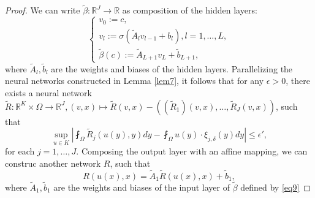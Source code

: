 \documentclass[reqno]{amsart}
\theoremstyle{plain}
\theoremstyle{definition}
\newcommand{\bb}[1]{\mathbb{#1}}
\begin{document}
\begin{proof}
    We can write $\tilde{\beta}:\bb R^J \to \bb R$ as composition of the hidden layers:
    $$
    \begin{cases} \label{eq9}
        v_0 := c,\\
        v_l := \sigma\left(\tilde{A}_lv_{l-1} + b_l\right), l = 1, \dots, L,\\
        \tilde{\beta}(c) := \tilde{A}_{L+1}v_L + \tilde{b}_{L+1},
    \end{cases}
    $$
    where $\tilde{A}_l, \tilde{b}_l$ are the weights and biases of the hidden layers. Parallelizing the neural networks constructed in Lemma \ref{lem7}, it follows that for any $\epsilon > 0$, there exists a neural network $\tilde{R}: \bb R^K \times \Omega \to \bb R^J, (v,x) \mapsto \tilde{R}(v,x) - ((\tilde{R}_1)(v,x), \dots, \tilde{R}_J(v,x))$, such that
    $$ \sup_{u \in K}\left|\fint_\Omega \tilde{R}_j(u(y),y) dy - \fint_\Omega u(y)\cdot \xi_{j,\delta}(y) dy\right| \leq \epsilon',$$
    for each $j = 1,\dots, J$. Composing the output layer with an affine mapping, we can construc another network $R$, such that
    $$ R(u(x),x) = \tilde{A}_1\tilde{R}(u(x),x) + \tilde{b}_1,$$
    where $\tilde{A}_1,\tilde{b}_1$ are the weights and biases of the input layer of $\tilde{\beta}$ defined by \ref{eq9}

\end{proof}
\end{document}

